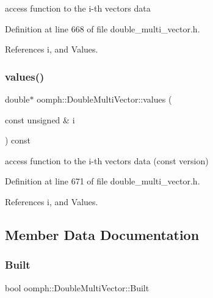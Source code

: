 access function to the i-\/th vector\textquotesingle{}s data 



Definition at line 668 of file double\+\_\+multi\+\_\+vector.\+h.



References i, and Values.

\mbox{\label{classoomph_1_1DoubleMultiVector_a8590d3a32b972e5ef0a2f801cd6cd80b}} 
\subsubsection{\texorpdfstring{values()}{values()}\hspace{0.1cm}{\footnotesize\ttfamily [4/4]}}
{\footnotesize\ttfamily double$\ast$ oomph\+::\+Double\+Multi\+Vector\+::values (\begin{DoxyParamCaption}\item[{const unsigned \&}]{i }\end{DoxyParamCaption}) const\hspace{0.3cm}{\ttfamily [inline]}}



access function to the i-\/th vector\textquotesingle{}s data (const version) 



Definition at line 671 of file double\+\_\+multi\+\_\+vector.\+h.



References i, and Values.



\subsection{Member Data Documentation}
\mbox{\label{classoomph_1_1DoubleMultiVector_a86924834b6045e4824a6088e97e35cc8}} 
\subsubsection{\texorpdfstring{Built}{Built}}
{\footnotesize\ttfamily bool oomph\+::\+Double\+Multi\+Vector\+::\+Built\hspace{0.3cm}{\ttfamily [private]}}



